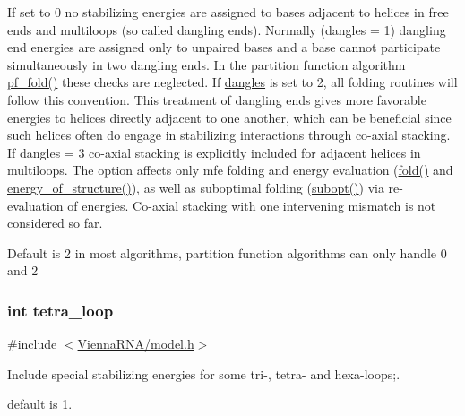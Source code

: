 If set to 0 no stabilizing energies are assigned to bases adjacent to helices in free ends and multiloops (so called dangling ends). Normally (dangles = 1) dangling end energies are assigned only to unpaired bases and a base cannot participate simultaneously in two dangling ends. In the partition function algorithm \hyperlink{group__pf__fold_gadc3db3d98742427e7001a7fd36ef28c2}{pf\+\_\+fold()} these checks are neglected. If \hyperlink{group__model__details_ga72b511ed1201f7e23ec437e468790d74}{dangles} is set to 2, all folding routines will follow this convention. This treatment of dangling ends gives more favorable energies to helices directly adjacent to one another, which can be beneficial since such helices often do engage in stabilizing interactions through co-\/axial stacking.~\newline
If dangles = 3 co-\/axial stacking is explicitly included for adjacent helices in multiloops. The option affects only mfe folding and energy evaluation (\hyperlink{group__mfe__fold__single_gaadafcb0f140795ae62e5ca027e335a9b}{fold()} and \hyperlink{group__eval_gaf93986cb3cb29770ec9cca69c9fab8cf}{energy\+\_\+of\+\_\+structure()}), as well as suboptimal folding (\hyperlink{group__subopt__wuchty_ga700f662506a233e42dd7fda74fafd40e}{subopt()}) via re-\/evaluation of energies. Co-\/axial stacking with one intervening mismatch is not considered so far.

Default is 2 in most algorithms, partition function algorithms can only handle 0 and 2 
\subsubsection[{\texorpdfstring{tetra\+\_\+loop}{tetra_loop}}]{\setlength{\rightskip}{0pt plus 5cm}int tetra\+\_\+loop}\hypertarget{group__model__details_ga4f6265bdf0ead7ff4628a360adbfd77e}{}\label{group__model__details_ga4f6265bdf0ead7ff4628a360adbfd77e}


{\ttfamily \#include $<$\hyperlink{model_8h}{Vienna\+R\+N\+A/model.\+h}$>$}



Include special stabilizing energies for some tri-\/, tetra-\/ and hexa-\/loops;. 

default is 1. 
